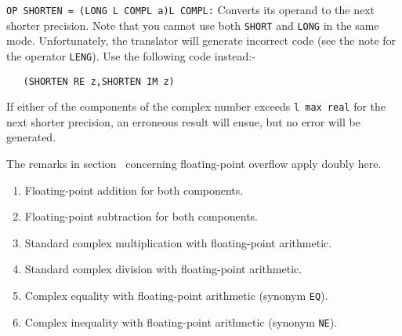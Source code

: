 \begin{enumerate}
\verb|OP SHORTEN = (LONG L COMPL a)L COMPL:| \newline
Converts its operand to the next shorter precision. Note that you
cannot use both \verb|SHORT| and \verb|LONG| in the same mode.
Unfortunately, the 
translator will generate incorrect code (see the note for the
operator \verb|LENG|). Use the following code instead:-
\begin{verbatim}
   (SHORTEN RE z,SHORTEN IM z)
\end{verbatim}
\noindent
If either of the components of the complex number exceeds
\verb|l max real| for the next shorter precision, an erroneous result
will ensue, but no error will be generated.
\end{enumerate}

The remarks in section~ concerning
floating-point overflow apply doubly here.
\begin{enumerate}
\item {}
\newline
Floating-point addition for both components.
\item {}
\newline
Floating-point subtraction for both components.
\item {} \newline
Standard complex multiplication with floating-point arithmetic.
\item {} \newline
Standard complex division with floating-point arithmetic.
\item {}\newline
Complex equality with floating-point arithmetic (synonym \verb|EQ|).
\item {}\newline
Complex inequality with floating-point arithmetic (synonym \verb|NE|).
\end{enumerate}


